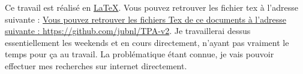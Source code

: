 Ce travail est réalisé en \href{https://www.latex-project.org/}{LaTeX}. Vous pouvez retrouver les fichier tex à l'adresse suivante : \href{Vous pouvez retrouver les fichiers Tex de ce documents à l'adresse suivante : \href{https://github.com/jubnl/TPA-v2}{https://github.com/jubnl/TPA-v2}}{Vous pouvez retrouver les fichiers Tex de ce documents à l'adresse suivante : \href{https://github.com/jubnl/TPA-v2}{https://github.com/jubnl/TPA-v2}}. Je travaillerai dessus essentiellement les weekends et en cours directement, n'ayant pas vraiment le temps pour ça au travail. La problématique étant connue, je vais pouvoir effectuer mes recherches sur internet directement.